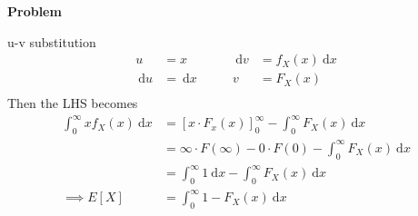 \documentclass[12pt]{article}
\newenvironment{Ex}{\textbf{Problem}\vspace{.75em}\\}{}
\newcommand{\dd}[1]{\:\mathrm{d}{#1}}
\begin{document}
\begin{enumerate}
\begin{Ex}
\begin{solution}
      u-v substitution
      \begin{equation}
        \label{eq:7-u-sub}
        \begin{aligned}
          u &= x \quad&\quad \dd{v}&=f_X(x)\dd{x} \\
          \dd{u}&=\dd{x} \quad&\quad v&=F_X(x) \\
        \end{aligned}
      \end{equation}
      Then the LHS becomes
      \begin{equation}
        \label{eq:7-sol-continued}
        \begin{aligned}
          \int_{0}^{\infty} x f_X(x) \dd{x} &=
          [x\cdot F_x(x)]_{0}^{\infty} - \int_{0}^{\infty}F_X(x)\dd{x} \\
          &= \infty\cdot F(\infty)-0\cdot F(0)-\int_{0}^{\infty}F_X(x)\dd{x} \\
          &= \int_0^{\infty}1\dd{x} - \int_{0}^{\infty}F_X(x)\dd{x} \\
          \implies E[X] &= \int_{0}^{\infty}1-F_X(x)\dd{x} \\
        \end{aligned}
      \end{equation}
    \end{solution}
  \end{Ex}
\end{enumerate}
\end{document}
